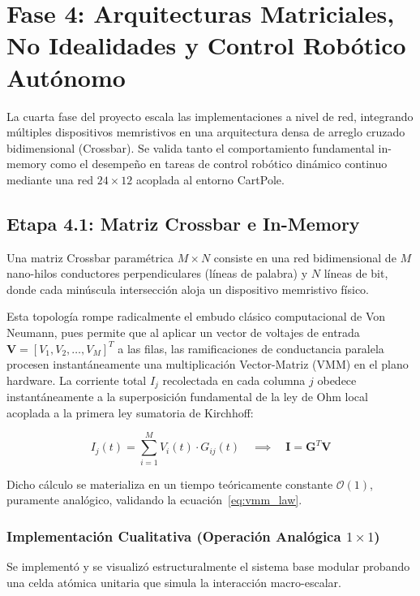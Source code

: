 
\chapter{Fase 4: Arquitecturas Matriciales, No Idealidades y Control Robótico Autónomo}
\label{ch:fase4}

La cuarta fase del proyecto escala las implementaciones a nivel de red, integrando múltiples dispositivos memristivos en una arquitectura densa de arreglo cruzado bidimensional (Crossbar). Se valida tanto el comportamiento fundamental in-memory como el desempeño en tareas de control robótico dinámico continuo mediante una red $24 \times 12$ acoplada al entorno CartPole.

\section{Etapa 4.1: Matriz Crossbar e In-Memory}
\label{sec:etapa4_1}

Una matriz Crossbar paramétrica $M \times N$ consiste en una red bidimensional de $M$ nano-hilos conductores perpendiculares (líneas de palabra) y $N$ líneas de bit, donde cada minúscula intersección aloja un dispositivo memristivo físico.

Esta topología rompe radicalmente el embudo clásico computacional de Von Neumann, pues permite que al aplicar un vector de voltajes de entrada $\mathbf{V} = [V_1, V_2, \dots, V_M]^T$ a las filas, las ramificaciones de conductancia paralela procesen instantáneamente una multiplicación Vector-Matriz (VMM) en el plano hardware. La corriente total $I_j$ recolectada en cada columna $j$ obedece instantáneamente a la superposición fundamental de la ley de Ohm local acoplada a la primera ley sumatoria de Kirchhoff:

\begin{equation}
I_j(t) = \sum_{i=1}^M V_i(t) \cdot G_{ij}(t) \quad \implies \quad \mathbf{I} = \mathbf{G}^T \mathbf{V}
\label{eq:vmm_law}
\end{equation}

Dicho cálculo se materializa en un tiempo teóricamente constante $\mathcal{O}(1)$, puramente analógico, validando la ecuación~\ref{eq:vmm_law}.

\subsection{Implementación Cualitativa (Operación Analógica $1 \times 1$)}
Se implementó y se visualizó estructuralmente el sistema base modular probando una celda atómica unitaria que simula la interacción macro-escalar. 

